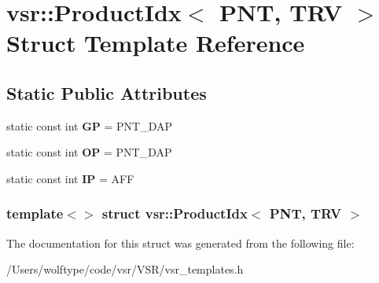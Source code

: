 \hypertarget{structvsr_1_1_product_idx_3_01_p_n_t_00_01_t_r_v_01_4}{\section{vsr\-:\-:Product\-Idx$<$ P\-N\-T, T\-R\-V $>$ Struct Template Reference}
\label{structvsr_1_1_product_idx_3_01_p_n_t_00_01_t_r_v_01_4}
}
\subsection*{Static Public Attributes}
\begin{DoxyCompactItemize}
\item 
\hypertarget{structvsr_1_1_product_idx_3_01_p_n_t_00_01_t_r_v_01_4_ac0e90c5640eb11d0bbc6a16f4b82210c}{static const int {\bfseries G\-P} = P\-N\-T\-\_\-\-D\-A\-P}\label{structvsr_1_1_product_idx_3_01_p_n_t_00_01_t_r_v_01_4_ac0e90c5640eb11d0bbc6a16f4b82210c}

\item 
\hypertarget{structvsr_1_1_product_idx_3_01_p_n_t_00_01_t_r_v_01_4_ab172209ff0fce47c1110ab147ecb1a9c}{static const int {\bfseries O\-P} = P\-N\-T\-\_\-\-D\-A\-P}\label{structvsr_1_1_product_idx_3_01_p_n_t_00_01_t_r_v_01_4_ab172209ff0fce47c1110ab147ecb1a9c}

\item 
\hypertarget{structvsr_1_1_product_idx_3_01_p_n_t_00_01_t_r_v_01_4_a06ce1e450ee84ebfbd763f3169f64b1d}{static const int {\bfseries I\-P} = A\-F\-F}\label{structvsr_1_1_product_idx_3_01_p_n_t_00_01_t_r_v_01_4_a06ce1e450ee84ebfbd763f3169f64b1d}

\end{DoxyCompactItemize}
\subsubsection*{template$<$$>$ struct vsr\-::\-Product\-Idx$<$ P\-N\-T, T\-R\-V $>$}



The documentation for this struct was generated from the following file\-:\begin{DoxyCompactItemize}
\item 
/\-Users/wolftype/code/vsr/\-V\-S\-R/vsr\-\_\-templates.\-h\end{DoxyCompactItemize}
